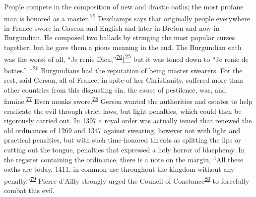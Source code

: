 People compete in the composition of new and drastic oaths; the most
profane man is honored as a
master.\textsuperscript{\protect\hypertarget{13_Chapter_Six__THE_DEPICTION_OF_TH.xhtmlux5cux23id_1121}{\protect\hyperlink{23_NOTES.xhtmlux5cux23id_1122}{75}}}
Deschamps says that originally people everywhere in France swore in
Gascon and English and later in Breton and now in Burgundian. He
composed two ballads by stringing the most popular curses together, but
he gave them a pious meaning in the end. The Burgundian oath was the
worst of all, ``Je renie
Dieu,''\textsuperscript{\protect\hypertarget{13_Chapter_Six__THE_DEPICTION_OF_TH.xhtmlux5cux23id_1120}{\protect\hyperlink{23_NOTES.xhtmlux5cux23page_419}{76}}}\protect\hypertarget{13_Chapter_Six__THE_DEPICTION_OF_TH.xhtmlux5cux23id_3037}{\protect\hyperlink{23_NOTES.xhtmlux5cux23id_3038}{†\textsuperscript{25}}}
but it was toned down to ``Je
\protect\hypertarget{13_Chapter_Six__THE_DEPICTION_OF_TH.xhtmlux5cux23page_187}{}{}renie
de bottes.''
\protect\hypertarget{13_Chapter_Six__THE_DEPICTION_OF_TH.xhtmlux5cux23id_3039}{\protect\hyperlink{23_NOTES.xhtmlux5cux23id_3040}{*\textsuperscript{26}}}
Burgundians had the reputation of being master swearers. For the rest,
said Gerson, all of France, in spite of her Christianity, suffered more
than other countries from this disgusting sin, the cause of pestilence,
war, and
famine.\textsuperscript{\protect\hypertarget{13_Chapter_Six__THE_DEPICTION_OF_TH.xhtmlux5cux23id_1118}{\protect\hyperlink{23_NOTES.xhtmlux5cux23id_1119}{77}}}
Even monks
swore.\textsuperscript{\protect\hypertarget{13_Chapter_Six__THE_DEPICTION_OF_TH.xhtmlux5cux23id_1116}{\protect\hyperlink{23_NOTES.xhtmlux5cux23id_1117}{78}}}
Gerson wanted the authorities and estates to help eradicate the evil
through strict laws, but light penalties, which could then be rigorously
carried out. In 1397 a royal order was actually issued that renewed the
old ordinances of 1269 and 1347 against swearing, however not with light
and practical penalties, but with such time-honored threats as splitting
the lips or cutting out the tongue, penalties that expressed a holy
horror of blasphemy. In the register containing the ordinance, there is
a note on the margin, ``All these oaths are today, 1411, in common use
throughout the kingdom without any
penalty.''\textsuperscript{\protect\hypertarget{13_Chapter_Six__THE_DEPICTION_OF_TH.xhtmlux5cux23id_1114}{\protect\hyperlink{23_NOTES.xhtmlux5cux23id_1115}{79}}}
Pierre d'Ailly strongly urged the Council of
Constance\textsuperscript{\protect\hypertarget{13_Chapter_Six__THE_DEPICTION_OF_TH.xhtmlux5cux23id_1112}{\protect\hyperlink{23_NOTES.xhtmlux5cux23id_1113}{80}}}
to forcefully combat this evil.

